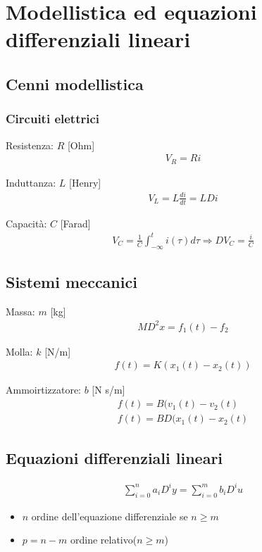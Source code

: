 \chapter{Modellistica ed equazioni differenziali lineari}

\section{Cenni modellistica}
\subsection{Circuiti elettrici}

Resistenza: $R$ [Ohm]
\begin{align}
  V_R = R i
\end{align}

Induttanza: $L$ [Henry]
\begin{align}
  V_L = L \frac{di}{dt} = LDi
\end{align}

Capacità: $C$ [Farad]
\begin{align}
  V_C = \frac{1}{C} \int_{-\infty}^t i(\tau) d\tau \Rightarrow DV_C = \frac{i}{C}
\end{align}

\section{Sistemi meccanici}
Massa: $m$ [kg]
\begin{align}
  MD^2x = f_1(t) - f_2
\end{align}


Molla: $k$ [N/m]
\begin{align}
  f(t) = K(x_1(t) - x_2(t))
\end{align}

Ammoirtizzatore: $b$ [N s/m]
\begin{align}
  f(t) = B(v_1(t) - v_2(t) \\
  f(t) = BD(x_1(t) - x_2(t)
\end{align}


\section{Equazioni differenziali lineari}

\begin{align}
  \sum_{i=0}^n a_i D^i y = \sum_{i=0}^m b_i D^i u
\end{align}


\begin{itemize}
  \item $n$ ordine dell'equazione differenziale se $n \geq m$
  \item $p = n - m$ ordine relativo($n \geq m$)
\end{itemize}



